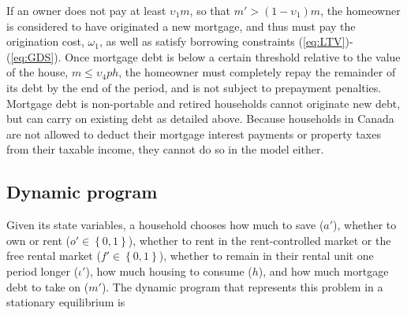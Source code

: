 \documentclass[parskip=full]{article}
\begin{document}
\noindent If an owner does not pay at least $\upsilon_{1}m$, so that $m'>(1-\upsilon_{1})m$, the homeowner is considered to have originated a new mortgage, and thus must pay the origination cost, $\omega_{1}$, as well as satisfy borrowing constraints (\ref{eq:LTV})-(\ref{eq:GDS}). Once mortgage debt is below a certain threshold relative to the value of the house, $m \leq \upsilon_{4}ph$, the homeowner must completely repay the remainder of its debt by the end of the period, and is not subject to prepayment penalties. Mortgage debt is non-portable and retired households cannot originate new debt, but can carry on existing debt as detailed above. Because households in Canada are not allowed to deduct their mortgage interest payments or property taxes from their taxable income, they cannot do so in the model either.

\subsection{Dynamic program}\label{subsection:household_optimization}
Given its state variables, a household chooses how much to save ($a'$), whether to own or rent ($o' \in \left\{0,1\right\}$), whether to rent in the rent-controlled market or the free rental market ($f' \in \left\{0,1\right\}$), whether to remain in their rental unit one period longer ($\iota'$), how much housing to consume ($h$), and how much mortgage debt to take on ($m'$). The dynamic program that represents this problem in a stationary equilibrium is
\end{document}
